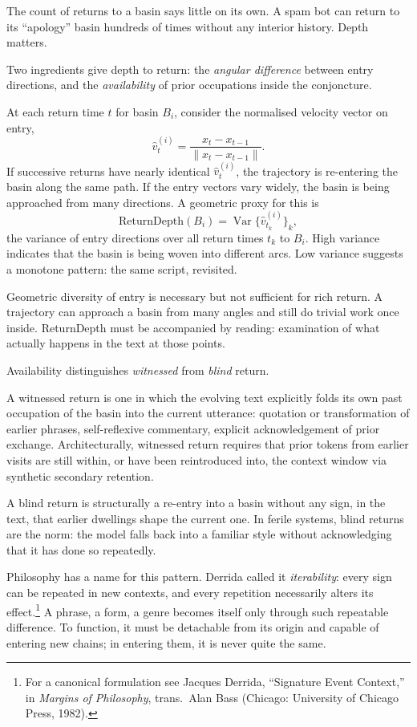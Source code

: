 \documentclass[12pt,a4paper]{article}
\begin{document}
The count of returns to a basin says little on its own. A spam bot can return to its ``apology'' basin hundreds of times without any interior history. Depth matters.

Two ingredients give depth to return: the \emph{angular difference} between entry directions, and the \emph{availability} of prior occupations inside the conjoncture.

At each return time $t$ for basin $B_i$, consider the normalised velocity vector on entry,
\[
\hat{v}^{(i)}_t = \frac{x_t - x_{t-1}}{\|x_t - x_{t-1}\|}.
\]
If successive returns have nearly identical $\hat{v}^{(i)}_t$, the trajectory is re-entering the basin along the same path. If the entry vectors vary widely, the basin is being approached from many directions. A geometric proxy for this is
\begin{equation}
\text{ReturnDepth}(B_i) = \operatorname{Var}\bigl\{\hat{v}^{(i)}_{t_k}\bigr\}_k,
\end{equation}
the variance of entry directions over all return times $t_k$ to $B_i$. High variance indicates that the basin is being woven into different arcs. Low variance suggests a monotone pattern: the same script, revisited.

Geometric diversity of entry is necessary but not sufficient for rich return. A trajectory can approach a basin from many angles and still do trivial work once inside. ReturnDepth must be accompanied by reading: examination of what actually happens in the text at those points.

Availability distinguishes \emph{witnessed} from \emph{blind} return.

A witnessed return is one in which the evolving text explicitly folds its own past occupation of the basin into the current utterance: quotation or transformation of earlier phrases, self-reflexive commentary, explicit acknowledgement of prior exchange. Architecturally, witnessed return requires that prior tokens from earlier visits are still within, or have been reintroduced into, the context window via synthetic secondary retention.

A blind return is structurally a re-entry into a basin without any sign, in the text, that earlier dwellings shape the current one. In ferile systems, blind returns are the norm: the model falls back into a familiar style without acknowledging that it has done so repeatedly.

Philosophy has a name for this pattern. Derrida called it \emph{iterability}: every sign can be repeated in new contexts, and every repetition necessarily alters its effect.\footnote{For a canonical formulation see Jacques Derrida, ``Signature Event Context,'' in \emph{Margins of Philosophy}, trans.\ Alan Bass (Chicago: University of Chicago Press, 1982).} A phrase, a form, a genre becomes itself only through such repeatable difference. To function, it must be detachable from its origin and capable of entering new chains; in entering them, it is never quite the same.
\end{document}
